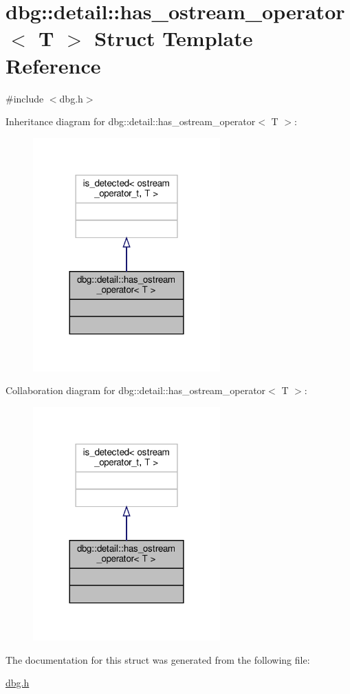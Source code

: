 \hypertarget{structdbg_1_1detail_1_1has__ostream__operator}{}\section{dbg\+:\+:detail\+:\+:has\+\_\+ostream\+\_\+operator$<$ T $>$ Struct Template Reference}
\label{structdbg_1_1detail_1_1has__ostream__operator}


{\ttfamily \#include $<$dbg.\+h$>$}



Inheritance diagram for dbg\+:\+:detail\+:\+:has\+\_\+ostream\+\_\+operator$<$ T $>$\+:\nopagebreak
\begin{figure}[H]
\begin{center}
\leavevmode
\includegraphics[width=204pt]{d3/d95/structdbg_1_1detail_1_1has__ostream__operator__inherit__graph}
\end{center}
\end{figure}


Collaboration diagram for dbg\+:\+:detail\+:\+:has\+\_\+ostream\+\_\+operator$<$ T $>$\+:\nopagebreak
\begin{figure}[H]
\begin{center}
\leavevmode
\includegraphics[width=204pt]{d1/de1/structdbg_1_1detail_1_1has__ostream__operator__coll__graph}
\end{center}
\end{figure}


The documentation for this struct was generated from the following file\+:\begin{DoxyCompactItemize}
\item 
\hyperlink{dbg_8h}{dbg.\+h}\end{DoxyCompactItemize}

